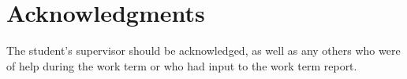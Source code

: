 \section*{Acknowledgments}
	The student's supervisor should be acknowledged, as well as any others who were of help during the work term or who had input to the work term report.
 
